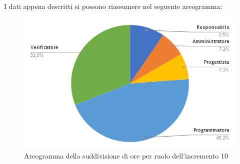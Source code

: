 \pagebreak
I dati appena descritti si possono riassumere nel seguente areogramma:
\begin{figure}[!h]
    \vspace{5px}
    \includegraphics[scale=0.5]{../../../Images/Diagrammi/Diagramma a torta/areogrammaIncremento10.png}
    \centering
    \caption{Areogramma della suddivisione di ore per ruolo dell'incremento 10}
\end{figure}

